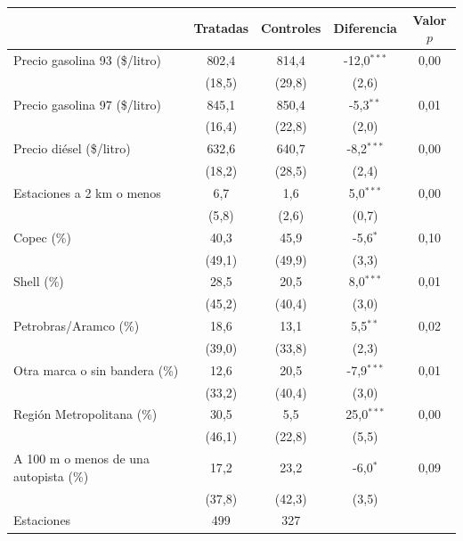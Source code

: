 \begin{tabular}{lcccc}
\toprule
 & Tratadas & Controles & Diferencia & Valor $p$ \\
\midrule
Precio gasolina 93 (\$/litro) & 802{,}4 & 814{,}4 & -12{,}0$^{***}$ & 0{,}00 \\
 & (18{,}5) & (29{,}8) & (2{,}6) &  \\
Precio gasolina 97 (\$/litro) & 845{,}1 & 850{,}4 & -5{,}3$^{**}$ & 0{,}01 \\
 & (16{,}4) & (22{,}8) & (2{,}0) &  \\
Precio diésel (\$/litro) & 632{,}6 & 640{,}7 & -8{,}2$^{***}$ & 0{,}00 \\
 & (18{,}2) & (28{,}5) & (2{,}4) &  \\
Estaciones a 2 km o menos & 6{,}7 & 1{,}6 & 5{,}0$^{***}$ & 0{,}00 \\
 & (5{,}8) & (2{,}6) & (0{,}7) &  \\
Copec (\%) & 40{,}3 & 45{,}9 & -5{,}6$^{*}$ & 0{,}10 \\
 & (49{,}1) & (49{,}9) & (3{,}3) &  \\
Shell (\%) & 28{,}5 & 20{,}5 & 8{,}0$^{***}$ & 0{,}01 \\
 & (45{,}2) & (40{,}4) & (3{,}0) &  \\
Petrobras/Aramco (\%) & 18{,}6 & 13{,}1 & 5{,}5$^{**}$ & 0{,}02 \\
 & (39{,}0) & (33{,}8) & (2{,}3) &  \\
Otra marca o sin bandera (\%) & 12{,}6 & 20{,}5 & -7{,}9$^{***}$ & 0{,}01 \\
 & (33{,}2) & (40{,}4) & (3{,}0) &  \\
Región Metropolitana (\%) & 30{,}5 & 5{,}5 & 25{,}0$^{***}$ & 0{,}00 \\
 & (46{,}1) & (22{,}8) & (5{,}5) &  \\
A 100 m o menos de una autopista (\%) & 17{,}2 & 23{,}2 & -6{,}0$^{*}$ & 0{,}09 \\
 & (37{,}8) & (42{,}3) & (3{,}5) &  \\
\midrule
Estaciones & 499 & 327 &  &  \\
\bottomrule
\end{tabular}
